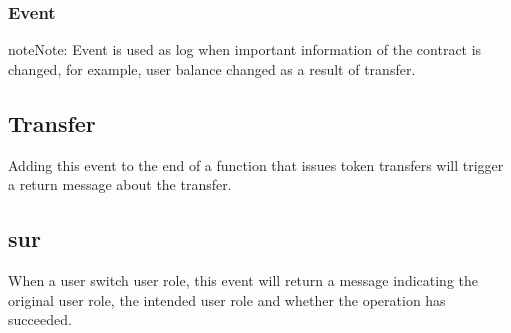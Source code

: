 \documentclass[letterpaper,10pt,english]{sphinxmanual}
\begin{document}
\subsubsection{Event}
\label{\detokenize{PublicFunctions:event}}
\begin{sphinxadmonition}{note}{Note:}
Event is used as log when important information of the contract is changed, for example, user balance changed as a result of transfer.
\end{sphinxadmonition}


\subsection{Transfer}
\label{\detokenize{PublicFunctions:id1}}
%
\begin{sphinxVerbatim}[commandchars=\\\{\}]
      
\end{sphinxVerbatim}

Adding this event to the end of a function that issues token transfers will trigger a return message about the transfer.


\subsection{sur}
\label{\detokenize{PublicFunctions:sur}}
%
\begin{sphinxVerbatim}[commandchars=\\\{\}]
      
\end{sphinxVerbatim}

When a user switch user role, this event will return a message indicating the original user role, the intended user role and whether the operation has succeeded.



\renewcommand{\indexname}{Index}
\printindex
\end{document}
